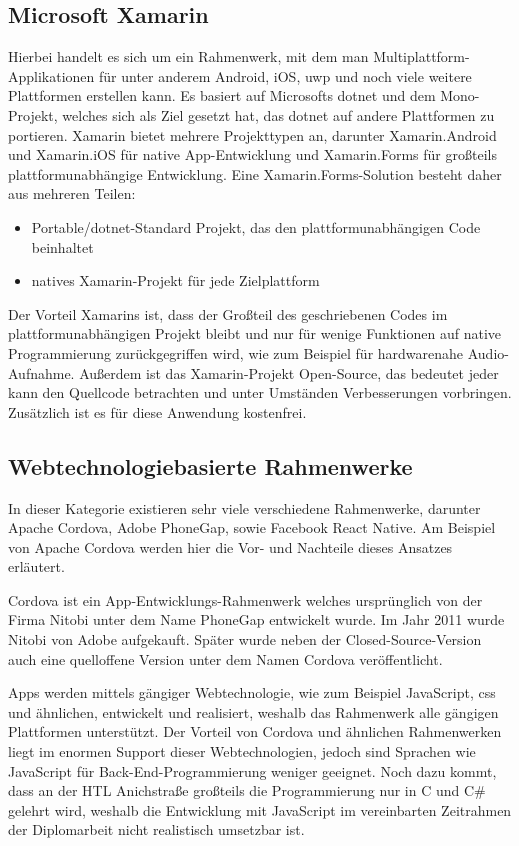 \subsection{Microsoft Xamarin}
Hierbei handelt es sich um ein Rahmenwerk, mit dem man Multiplattform-Applikationen für unter anderem Android, iOS, \ac{uwp} und noch viele weitere Plattformen erstellen kann.
Es basiert auf Microsofts \ac{dotnet} und dem Mono-Projekt, welches sich als Ziel gesetzt hat, das \ac{dotnet} auf andere Plattformen zu portieren.
Xamarin bietet mehrere Projekttypen an, darunter Xamarin.Android und Xamarin.iOS für native App-Entwicklung und Xamarin.Forms für großteils plattformunabhängige Entwicklung.
Eine Xamarin.Forms-Solution besteht daher aus mehreren Teilen:
\begin{itemize}
    \item Portable/\ac{dotnet}-Standard Projekt, das den plattformunabhängigen Code beinhaltet
    \item natives Xamarin-Projekt für jede Zielplattform
\end{itemize}
Der Vorteil Xamarins ist, dass der Großteil des geschriebenen Codes im plattformunabhängigen Projekt bleibt und nur für wenige Funktionen auf native Programmierung zurückgegriffen wird, wie zum Beispiel für hardwarenahe Audio-Aufnahme.
Außerdem ist das Xamarin-Projekt Open-Source, das bedeutet jeder kann den Quellcode betrachten und unter Umständen Verbesserungen vorbringen.
Zusätzlich ist es für diese Anwendung kostenfrei.

\subsection{Webtechnologiebasierte Rahmenwerke}
In dieser Kategorie existieren sehr viele verschiedene Rahmenwerke, darunter Apache Cordova, Adobe PhoneGap, sowie Facebook React Native.
Am Beispiel von Apache Cordova werden hier die Vor- und Nachteile dieses Ansatzes erläutert.

Cordova ist ein App-Entwicklungs-Rahmenwerk welches ursprünglich von der Firma Nitobi unter dem Name PhoneGap entwickelt wurde.
Im Jahr 2011 wurde Nitobi von Adobe aufgekauft.
Später wurde neben der Closed-Source-Version auch eine quelloffene Version unter dem Namen Cordova veröffentlicht. \cite[vgl.][]{adobe-phonegap}\par

Apps werden mittels gängiger Webtechnologie, wie zum Beispiel JavaScript, \ac{css} und ähnlichen, entwickelt und realisiert, weshalb das Rahmenwerk alle gängigen Plattformen unterstützt.
Der Vorteil von Cordova und ähnlichen Rahmenwerken liegt im enormen Support dieser Webtechnologien, jedoch sind Sprachen wie JavaScript für Back-End-Programmierung weniger geeignet.
Noch dazu kommt, dass an der HTL Anichstraße großteils die Programmierung nur in C und C\# gelehrt wird, weshalb die Entwicklung mit JavaScript im vereinbarten Zeitrahmen der Diplomarbeit nicht realistisch umsetzbar ist.

